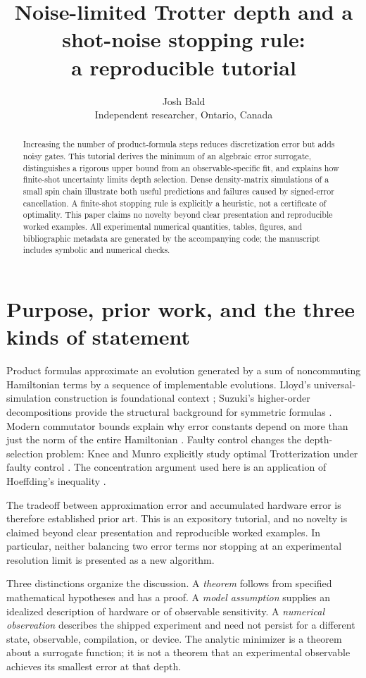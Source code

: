 \documentclass{article}
\title{Noise-limited Trotter depth and a shot-noise stopping rule:\\a reproducible tutorial}
\author{Josh Bald\\Independent researcher, Ontario, Canada\\\texttt{\AuthorEmail}}
\date{}
\begin{document}
\maketitle
\begin{abstract}
Increasing the number of product-formula steps reduces discretization error but adds noisy gates. This tutorial derives the minimum of an algebraic error surrogate, distinguishes a rigorous upper bound from an observable-specific fit, and explains how finite-shot uncertainty limits depth selection. Dense density-matrix simulations of a small spin chain illustrate both useful predictions and failures caused by signed-error cancellation. A finite-shot stopping rule is explicitly a heuristic, not a certificate of optimality. This paper claims no novelty beyond clear presentation and reproducible worked examples. All experimental numerical quantities, tables, figures, and bibliographic metadata are generated by the accompanying code; the manuscript includes symbolic and numerical checks.
\end{abstract}

\section{Purpose, prior work, and the three kinds of statement}
Product formulas approximate an evolution generated by a sum of noncommuting Hamiltonian terms by a sequence of implementable evolutions. Lloyd's universal-simulation construction is foundational context \cite{lloyd}; Suzuki's higher-order decompositions provide the structural background for symmetric formulas \cite{suzuki}. Modern commutator bounds explain why error constants depend on more than just the norm of the entire Hamiltonian \cite{childs}. Faulty control changes the depth-selection problem: Knee and Munro explicitly study optimal Trotterization under faulty control \cite{knee}. The concentration argument used here is an application of Hoeffding's inequality \cite{hoeffding}.

The tradeoff between approximation error and accumulated hardware error is therefore established prior art. This is an expository tutorial, and no novelty is claimed beyond clear presentation and reproducible worked examples. In particular, neither balancing two error terms nor stopping at an experimental resolution limit is presented as a new algorithm.

Three distinctions organize the discussion. A \emph{theorem} follows from specified mathematical hypotheses and has a proof. A \emph{model assumption} supplies an idealized description of hardware or of observable sensitivity. A \emph{numerical observation} describes the shipped experiment and need not persist for a different state, observable, compilation, or device. The analytic minimizer is a theorem about a surrogate function; it is not a theorem that an experimental observable achieves its smallest error at that depth.
\end{document}
